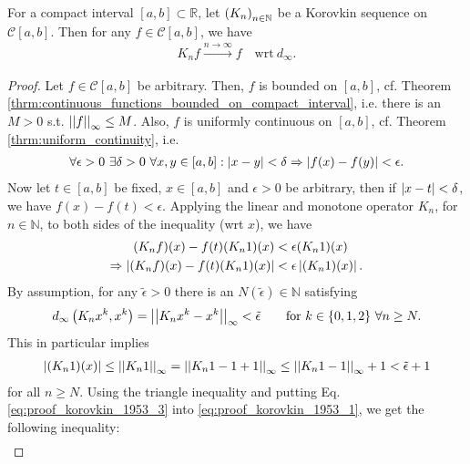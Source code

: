 \begin{theorem}[Korovkin, 1953]\label{thrm:korovkin_1953}
	For a compact interval $[a, b]\subset \mathbb R$, let $\seq[K_n]$ be a Korovkin sequence on $\mathcal C[a, b]$. Then for any $f\in\mathcal C[a, b]$, we have
	\begin{align}
		K_nf \overset{n\to\infty}{\longrightarrow} f \quad \text{wrt}\ d_{\infty}.
	\end{align}
\end{theorem}

\begin{proof}
	Let $f\in\mathcal C[a, b]$ be arbitrary. Then, $f$ is bounded on $[a, b]$, cf. Theorem \ref{thrm:continuous_functions_bounded_on_compact_interval}, i.e. there is an $M > 0$ s.t. $\norm{f}{\infty} \leq M$. Also, $f$ is uniformly continuous on $[a, b]$, cf. Theorem \ref{thrm:uniform_continuity}, i.e.
	\begin{align}
		\forall \epsilon > 0\ \exists \delta > 0\ \forall x, y\in [a, b]: \abs{x - y} < \delta \Rightarrow \abs{f(x) - f(y)} < \epsilon.
	\end{align}
	Now let $t\in[a, b]$ be fixed, $x\in[a, b]$ and $\epsilon > 0$ be arbitrary, then if $\abs{x - t} < \delta$, we have $f(x) - f(t) < \epsilon$. Applying the linear and monotone operator $K_n$, for $n\in\mathbb N$, to both sides of the inequality (wrt $x$), we have
	\begin{align}
		(K_nf)(x) - f(t)(K_n1)(x) &< \epsilon (K_n 1)(x)
		\\ \Rightarrow \abs{(K_nf)(x) - f(t)(K_n1)(x)} &< \epsilon\abs{(K_n 1)(x)}.\label{eq:proof_korovkin_1953_1}
	\end{align}
	By assumption, for any $\tilde{\epsilon} > 0$ there is an $N(\tilde{\epsilon})\in\mathbb N$ satisfying 
	\begin{align}\label{eq:proof_korovkin_1953_2}
		d_{\infty}\left(K_n x^k, x^k\right) = \norm{K_nx^k - x^k}{\infty} < \tilde{\epsilon} \qquad \text{for}\ k\in\{0, 1, 2\}\ \forall n\geq N.
	\end{align}
	This in particular implies
	\begin{align}\label{eq:proof_korovkin_1953_3}
		\abs{(K_n1)(x)} \leq \norm{K_n1}{\infty} = \norm{K_n1 - 1 + 1}{\infty} \leq \norm{K_n1 - 1}{\infty} + 1 < \tilde{\epsilon} + 1
	\end{align}
	for all $n\geq N$. Using the triangle inequality and putting Eq. \eqref{eq:proof_korovkin_1953_3} into \eqref{eq:proof_korovkin_1953_1}, we get the following inequality:
	\begin{align}

\end{align}
\end{proof}
